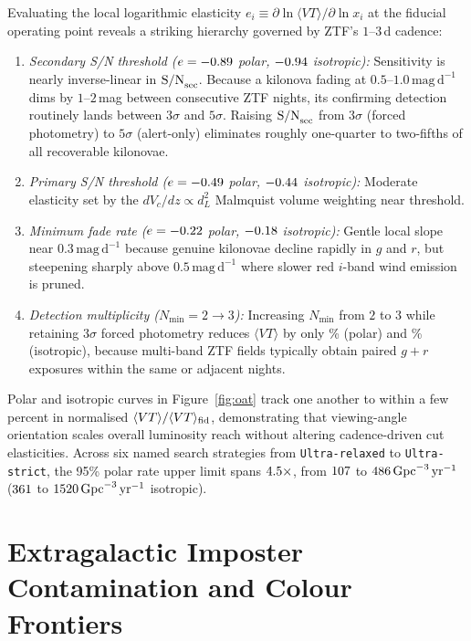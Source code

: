 \documentclass[twocolumn]{aastex631}
\newcommand{\vteff}{\langle VT\rangle}
\newcommand{\gpcyr}{\mathrm{Gpc}^{-3}\,\mathrm{yr}^{-1}}
\begin{document}
Evaluating the local logarithmic elasticity $e_i \equiv \partial \ln \vteff / \partial \ln x_i$ at the fiducial operating point reveals a striking hierarchy governed by ZTF's $1$--$3$\,d cadence:
\begin{enumerate}
    \item \emph{Secondary S/N threshold ($e = -0.89{}$ polar, $-0.94{}$ isotropic):} Sensitivity is nearly inverse-linear in $\mathrm{S/N}_{\rm sec}$. Because a kilonova fading at $0.5$--$1.0\,\mathrm{mag\,d}^{-1}$ dims by $1$--$2$\,mag between consecutive ZTF nights, its confirming detection routinely lands between $3\sigma$ and $5\sigma$. Raising $\mathrm{S/N}_{\rm sec}$ from $3\sigma$ (forced photometry) to $5\sigma$ (alert-only) eliminates roughly one-quarter to two-fifths of all recoverable kilonovae.
    \item \emph{Primary S/N threshold ($e = -0.49{}$ polar, $-0.44{}$ isotropic):} Moderate elasticity set by the $dV_c/dz \propto d_L^2$ Malmquist volume weighting near threshold.
    \item \emph{Minimum fade rate ($e = -0.22{}$ polar, $-0.18{}$ isotropic):} Gentle local slope near $0.3\,\mathrm{mag\,d}^{-1}$ because genuine kilonovae decline rapidly in $g$ and $r$, but steepening sharply above $0.5\,\mathrm{mag\,d}^{-1}$ where slower red $i$-band wind emission is pruned.
    \item \emph{Detection multiplicity ($N_{\min} = 2 \to 3$):} Increasing $N_{\min}$ from $2$ to $3$ while retaining $3\sigma$ forced photometry reduces $\vteff$ by only \NminThreeVTLossPolarPct{}\% (polar) and \NminThreeVTLossIsoPct{}\% (isotropic), because multi-band ZTF fields typically obtain paired $g+r$ exposures within the same or adjacent nights.
\end{enumerate}

Polar and isotropic curves in Figure~\ref{fig:oat} track one another to within a few percent in normalised $\vteff/\vteff_{\rm fid}$, demonstrating that viewing-angle orientation scales overall luminosity reach without altering cadence-driven cut elasticities. Across six named search strategies from \texttt{Ultra-relaxed} to \texttt{Ultra-strict}, the 95\% polar rate upper limit spans $4.5{}\times$, from $107{}$ to $\NamedRlimMaxPolar{}\,\gpcyr$ ($361{}$ to $\NamedRlimMaxIso{}\,\gpcyr$ isotropic).

\section{Extragalactic Imposter Contamination and Colour Frontiers}
\label{sec:imposters}
\end{document}
